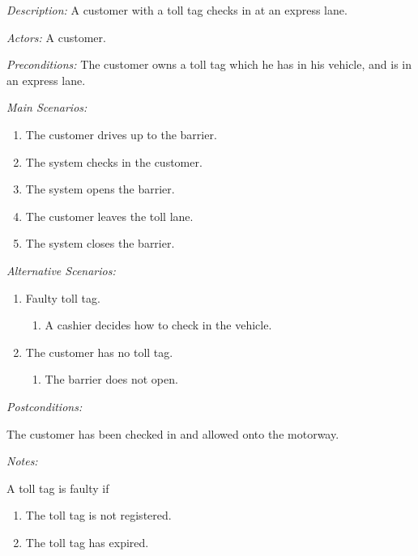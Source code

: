 \textit{Description: } A customer with a toll tag checks in at an express lane.

\textit{Actors:} A customer.

\textit{Preconditions:} The customer owns a toll tag which he has in his vehicle, and is in
an express lane.

\textit{Main Scenarios:}
\begin{enumerate}
\item The customer drives up to the barrier.
\item The system checks in the customer.
\item The system opens the barrier.
\item The customer leaves the toll lane.
\item The system closes the barrier.
\end{enumerate}

\textit{Alternative Scenarios:}
\begin{enumerate}
\item Faulty toll tag.

\begin{enumerate}
\item A cashier decides how to check in the vehicle.
\end{enumerate}
\item The customer has no toll tag.

\begin{enumerate}
\item The barrier does not open.
\end{enumerate}
\end{enumerate}

\textit{Postconditions:}

The customer has been checked in and allowed onto the motorway.

\textit{Notes:}

A toll tag is faulty if
\begin{enumerate}
\item The toll tag is not registered.
\item The toll tag has expired.\end{enumerate}


